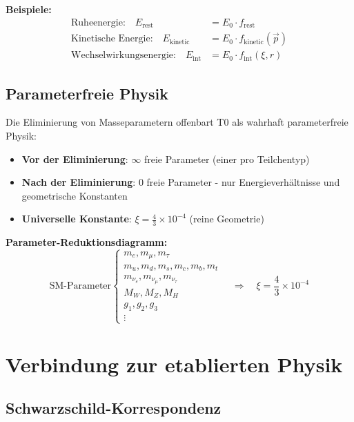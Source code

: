 \documentclass[12pt,a4paper]{report}
\begin{document}
	\textbf{Beispiele:}
	\begin{align}
		\text{Ruheenergie:} \quad E_{\text{rest}} &= E_0 \cdot f_{\text{rest}} \\
		\text{Kinetische Energie:} \quad E_{\text{kinetic}} &= E_0 \cdot f_{\text{kinetic}}(\vec{p}) \\
		\text{Wechselwirkungsenergie:} \quad E_{\text{int}} &= E_0 \cdot f_{\text{int}}(\xi, r)
	\end{align}
	
	\subsection{Parameterfreie Physik}
	\label{subsec:parameter_free}
	
	Die Eliminierung von Masseparametern offenbart T0 als wahrhaft parameterfreie Physik:
	\begin{itemize}
		\item \textbf{Vor der Eliminierung}: $\infty$ freie Parameter (einer pro Teilchentyp)
		\item \textbf{Nach der Eliminierung}: 0 freie Parameter - nur Energieverhältnisse und geometrische Konstanten
		\item \textbf{Universelle Konstante}: $\xi = \frac{4}{3} \times 10^{-4}$ (reine Geometrie)
	\end{itemize}
	
	\textbf{Parameter-Reduktionsdiagramm:}
	\begin{equation}
		\text{SM-Parameter} \begin{cases}
			m_e, m_\mu, m_\tau \\
			m_u, m_d, m_s, m_c, m_b, m_t \\
			m_{\nu_e}, m_{\nu_\mu}, m_{\nu_\tau} \\
			M_W, M_Z, M_H \\
			g_1, g_2, g_3 \\
			\vdots
		\end{cases} \quad \Rightarrow \quad \xi = \frac{4}{3} \times 10^{-4}
	\end{equation}
	
	\section{Verbindung zur etablierten Physik}
	\label{sec:connection_established}
	
	\subsection{Schwarzschild-Korrespondenz}
	\label{subsec:schwarzschild_correspondence}
	
\end{document}
